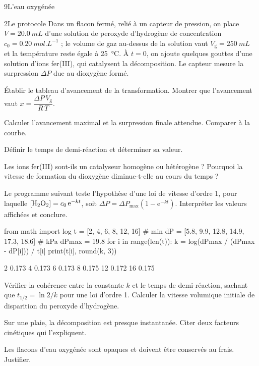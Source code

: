 \begin{exoBac}{9}{L'eau oxygénée}
\begin{docu}{2}{Le protocole}
Dans un flacon fermé, relié à un capteur de pression, on place $V=\qty{20,0}{mL}$ d'une solution de peroxyde d'hydrogène de
concentration $c_0=\qty{0,20}{mol.L^{-1}}$ ; le volume de gaz au-dessus de la solution vaut $V_\mathrm{g}=\qty{250}{mL}$ et la température
reste égale à \qty{25}{\degreeCelsius}. À $t=0$, on ajoute quelques gouttes d'une solution d'ions fer(III), qui catalysent la décomposition.
Le capteur mesure la surpression $\Delta P$ due au dioxygène formé.
\end{docu}
\begin{questions}[resume]
\item Établir le tableau d'avancement de la transformation. Montrer que l'avancement vaut $x=\dfrac{\Delta P\,V_\mathrm{g}}{R\,T}$.
\item Calculer l'avancement maximal et la surpression finale attendue. Comparer à la courbe.
\item Définir le temps de demi-réaction et déterminer sa valeur.
\item Les ions fer(III) sont-ils un catalyseur homogène ou hétérogène ? Pourquoi la vitesse de formation du dioxygène
diminue-t-elle au cours du temps ?
\item {}\initiative Le programme suivant teste l'hypothèse d'une loi de vitesse d'ordre 1, pour laquelle
$[\ce{H2O2}]=c_0\,\mathrm{e}^{-kt}$, soit $\Delta P=\Delta P_\mathrm{max}\left(1-\mathrm{e}^{-kt}\right)$. Interpréter les valeurs affichées et conclure.
\begin{codecote}[0.66]
\begin{pythoncol}
from math import log
t = [2, 4, 6, 8, 12, 16]              # min
dP = [5.8, 9.9, 12.8, 14.9, 17.3, 18.6]  # kPa
dPmax = 19.8
for i in range(len(t)):
    k = log(dPmax / (dPmax - dP[i])) / t[i]
    print(t[i], round(k, 3))
\end{pythoncol}
\cote
\begin{consolecol}
2 0.173
4 0.173
6 0.173
8 0.175
12 0.172
16 0.175
\end{consolecol}
\end{codecote}
\item Vérifier la cohérence entre la constante $k$ et le temps de demi-réaction, sachant que $t_{1/2}=\ln2/k$ pour une loi
d'ordre 1. Calculer la vitesse volumique initiale de disparition du peroxyde d'hydrogène.
\item Sur une plaie, la décomposition est presque instantanée. Citer deux facteurs cinétiques qui l'expliquent.
\item Les flacons d'eau oxygénée sont opaques et doivent être conservés au frais. Justifier.
\end{questions}
\end{exoBac}

